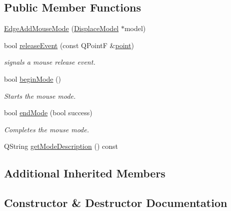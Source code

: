 \subsection*{Public Member Functions}
\begin{DoxyCompactItemize}
\item 
\mbox{\hyperlink{class_edge_add_mouse_mode_a16d3de22f4b0da639857b70c3192949f}{Edge\+Add\+Mouse\+Mode}} (\mbox{\hyperlink{class_displace_model}{Displace\+Model}} $\ast$model)
\item 
bool \mbox{\hyperlink{class_edge_add_mouse_mode_aee2cc27c8e2d482869c885b94d944026}{release\+Event}} (const Q\+PointF \&\mbox{\hyperlink{diffusion_8cpp_a380468221cb8294f9329d11c99c4da30}{point}})
\begin{DoxyCompactList}\small\item\em signals a mouse release event. \end{DoxyCompactList}\item 
bool \mbox{\hyperlink{class_edge_add_mouse_mode_aa6b0ad24f42497d75cc97cb2fae82b76}{begin\+Mode}} ()
\begin{DoxyCompactList}\small\item\em Starts the mouse mode. \end{DoxyCompactList}\item 
bool \mbox{\hyperlink{class_edge_add_mouse_mode_aa78402058c8efd76035be5f22109899d}{end\+Mode}} (bool success)
\begin{DoxyCompactList}\small\item\em Completes the mouse mode. \end{DoxyCompactList}\item 
Q\+String \mbox{\hyperlink{class_edge_add_mouse_mode_a1066045f847ba4ccfcd23d525b86c72b}{get\+Mode\+Description}} () const
\end{DoxyCompactItemize}
\subsection*{Additional Inherited Members}


\subsection{Constructor \& Destructor Documentation}
\mbox{\label{class_edge_add_mouse_mode_a16d3de22f4b0da639857b70c3192949f}} 

